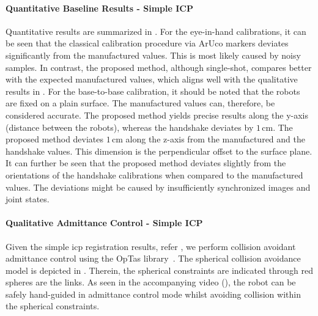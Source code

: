 
\paragraph{Quantitative Baseline Results - Simple ICP} Quantitative results are summarized in . For the eye-in-hand calibrations, it can be seen that the classical calibration procedure via ArUco markers deviates significantly from the manufactured values. This is most likely caused by noisy samples. In contrast, the proposed method, although single-shot, compares better with the expected manufactured values, which aligns well with the qualitative results in . For the base-to-base calibration, it should be noted that the robots are fixed on a plain surface. The manufactured values can, therefore, be considered accurate. The proposed method yields precise results along the y-axis (distance between the robots), whereas the handshake deviates by $1\,\text{cm}$. The proposed method deviates $1\,\text{cm}$ along the z-axis from the manufactured and the handshake values. This dimension is the perpendicular offset to the surface plane. It can further be seen that the proposed method deviates slightly from the orientations of the handshake calibrations when compared to the manufactured values. The deviations might be caused by insufficiently synchronized images and joint states.

\paragraph{Qualitative Admittance Control - Simple ICP} Given the simple \gls{icp} registration results, refer , we perform collision avoidant admittance control using the OpTas library~\cite{optas}. The spherical collision avoidance model is depicted in . Therein, the spherical constraints are indicated through red spheres are the links. As seen in the accompanying video (), the robot can be safely hand-guided in admittance control mode whilst avoiding collision within the spherical constraints.

